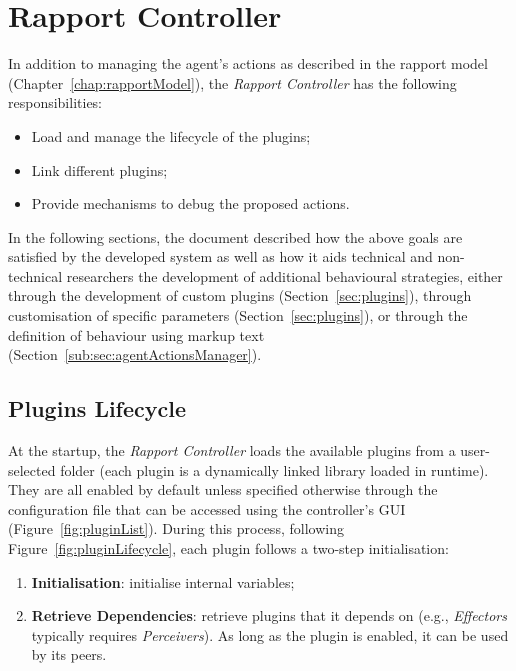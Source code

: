 \section{Rapport Controller}
\label{sec:rapportController2}

In addition to managing the agent's actions as described in the rapport model (Chapter~\ref{chap:rapportModel}), the \textit{Rapport Controller} has the following responsibilities:
\begin{itemize}
	\item Load and manage the lifecycle of the plugins;
	\item Link different plugins;
	\item Provide mechanisms to debug the proposed actions.
\end{itemize}

In the following sections, the document described how the above goals are satisfied by the developed system as well as how it aids technical and non-technical researchers the development of additional behavioural strategies, either through the development of custom plugins (Section~\ref{sec:plugins}), through customisation of specific parameters (Section~\ref{sec:plugins}), or through the definition of behaviour using markup text (Section~\ref{sub:sec:agentActionsManager}).

\subsection{Plugins Lifecycle}
\label{sub:sec:pluginLifecycle}

At the startup, the \textit{Rapport Controller} loads the available plugins from a user-selected folder (each plugin is a dynamically linked library loaded in runtime). They are all enabled by default unless specified otherwise through the configuration file that can be accessed using the controller's \ac{GUI} (Figure~\ref{fig:pluginList}). During this process, following Figure~\ref{fig:pluginLifecycle}, each plugin follows a two-step initialisation:

\begin{enumerate}
	\item \textbf{Initialisation}: initialise internal variables;
	\item \textbf{Retrieve Dependencies}: retrieve plugins that it depends on (e.g., \textit{Effectors} typically requires \textit{Perceivers}). As long as the plugin is enabled, it can be used by its peers.
\end{enumerate}

